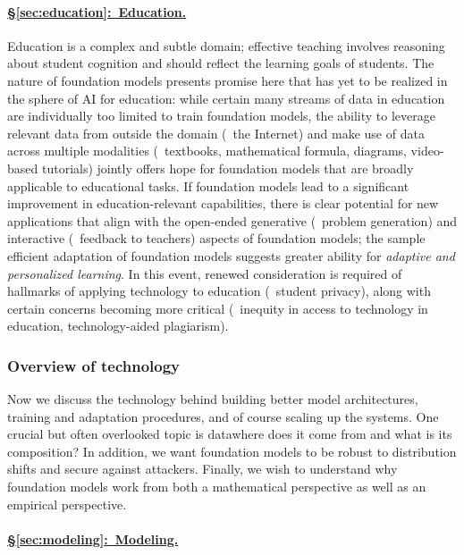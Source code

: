 \paragraph{\hyperref[sec:education]{§\ref{sec:education}:~Education.}} 

Education is a complex and subtle domain; effective teaching involves reasoning about student cognition and should reflect the learning goals of students.
The nature of foundation models presents promise here that has yet to be realized in the sphere of AI for education: while certain many streams of data in education are individually too limited to train foundation models, the ability to leverage relevant data from outside the domain (\eg~the Internet) and make use of data across multiple modalities (\eg~textbooks, mathematical formula, diagrams, video-based tutorials) jointly offers hope for foundation models that are broadly applicable to educational tasks.
If foundation models lead to a significant improvement in education-relevant capabilities, there is clear potential for new applications that align with the open-ended generative (\eg~problem generation) and interactive (\eg~feedback to teachers) aspects of foundation models; the sample efficient adaptation of foundation models suggests greater ability for \textit{adaptive and personalized learning}.
In this event, renewed consideration is required of hallmarks of applying technology to education (\eg~student privacy), along with certain concerns becoming more critical (\eg~inequity in access to technology in education, technology-aided plagiarism).

\subsubsection{Overview of technology}

Now we discuss the technology behind building better model architectures,
training and adaptation procedures, and of course scaling up the systems.
One crucial but often overlooked topic is data\dash{}where does it come from and
what is its composition?
In addition, we want foundation models to be robust to distribution shifts
and secure against attackers.
Finally, we wish to understand why foundation models work from both a mathematical perspective
as well as an empirical perspective.

\paragraph{\hyperref[sec:modeling]{§\ref{sec:modeling}:~Modeling.}}

